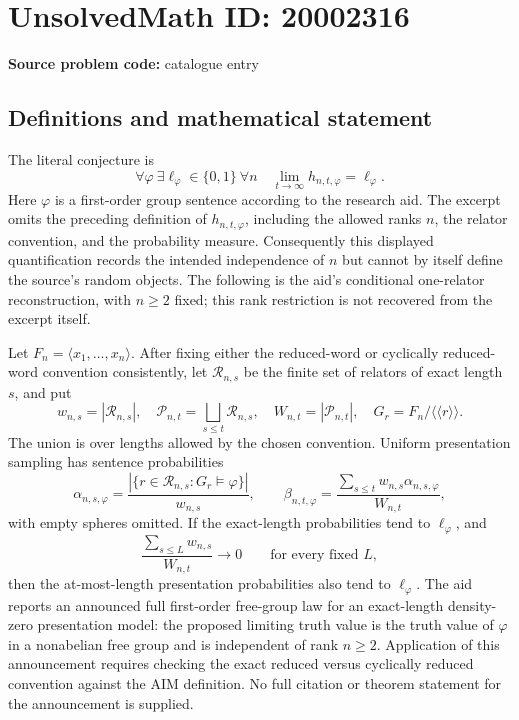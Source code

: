 \documentclass[11pt]{article}
\begin{document}
\section*{UnsolvedMath ID: 20002316}
\textbf{Source problem code:} catalogue entry
\subsection{Definitions and mathematical statement}
The literal conjecture is
\[
 \forall\varphi\ \exists\ell_\varphi\in\{0,1\}\ \forall n\quad
 \lim_{t\to\infty}h_{n,t,\varphi}=\ell_\varphi.
\]
Here \(\varphi\) is a first-order group sentence according to the research aid. The excerpt omits the preceding definition of \(h_{n,t,\varphi}\), including the allowed ranks \(n\), the relator convention, and the probability measure. Consequently this displayed quantification records the intended independence of \(n\) but cannot by itself define the source's random objects. The following is the aid's conditional one-relator reconstruction, with \(n\ge2\) fixed; this rank restriction is not recovered from the excerpt itself.

Let \(F_n=\langle x_1,\ldots,x_n\rangle\). After fixing either the reduced-word or cyclically reduced-word convention consistently, let \(\mathcal R_{n,s}\) be the finite set of relators of exact length \(s\), and put
\[
 w_{n,s}=|\mathcal R_{n,s}|,\quad
 \mathcal P_{n,t}=\bigsqcup_{s\le t}\mathcal R_{n,s},\quad
 W_{n,t}=|\mathcal P_{n,t}|,\quad
 G_r=F_n/\langle\!\langle r\rangle\!\rangle.
\]
The union is over lengths allowed by the chosen convention. Uniform presentation sampling has sentence probabilities
\[
 \alpha_{n,s,\varphi}=\frac{|\{r\in\mathcal R_{n,s}:G_r\models\varphi\}|}{w_{n,s}},\qquad
 \beta_{n,t,\varphi}=\frac{\sum_{s\le t}w_{n,s}\alpha_{n,s,\varphi}}{W_{n,t}},
\]
with empty spheres omitted. If the exact-length probabilities tend to \(\ell_\varphi\), and
\[
 \frac{\sum_{s\le L}w_{n,s}}{W_{n,t}}\longrightarrow0
 \qquad\text{for every fixed }L,
\]
then the at-most-length presentation probabilities also tend to \(\ell_\varphi\). The aid reports an announced full first-order free-group law for an exact-length density-zero presentation model: the proposed limiting truth value is the truth value of \(\varphi\) in a nonabelian free group and is independent of rank \(n\ge2\). Application of this announcement requires checking the exact reduced versus cyclically reduced convention against the AIM definition. No full citation or theorem statement for the announcement is supplied.
\end{document}
